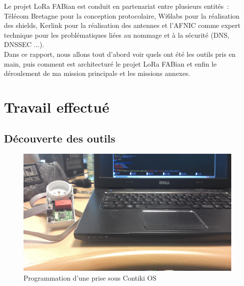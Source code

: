 \documentclass{article}
\begin{document}
Le projet LoRa FABian est conduit en partenariat entre plusieurs entités~: Télécom Bretagne pour la conception protocolaire, Wi6labs pour la réalisation des shields, Kerlink pour la réalisation des antennes et l'AFNIC comme expert technique pour les problématiques liées au nommage et à la sécurité (DNS, DNSSEC ...).\\
Dans ce rapport, nous allons tout d'abord voir quels ont été les outils pris en main, puis comment est architecturé le projet LoRa FABian et enfin le déroulement de ma mission principale et les missions annexes.

\section{Travail effectué}
\subsection{Découverte des outils}

	\begin{figure}[h]
		\begin{center}
			\includegraphics[scale=0.08]{../res/img/progprise.jpg}
			\caption{Programmation d'une prise sous Contiki OS}
			\label{fig:progprise}
		\end{center}
	\end{figure}
\end{document}

